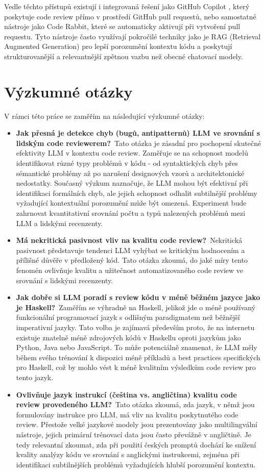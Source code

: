\documentclass[12pt, a4paper]{article}
\begin{document}
Vedle těchto přístupů existují i integrovaná řešení jako GitHub Copilot \cite{copilot2023}, který poskytuje code review přímo v prostředí GitHub pull requestů, nebo samostatné nástroje jako Code Rabbit, které se automaticky aktivují při vytvoření pull requestu. Tyto nástroje často využívají pokročilé techniky jako je RAG (Retrieval Augmented Generation) pro lepší porozumění kontextu kódu a poskytují strukturovanější a relevantnější zpětnou vazbu než obecné chatovací modely.


\section{Výzkumné otázky}
V rámci této práce se zaměřím na následující výzkumné otázky:
\begin{itemize}
\item \textbf{Jak přesná je detekce chyb (bugů, antipatternů) LLM ve srovnání s lidským code reviewerem?}\
Tato otázka je zásadní pro pochopení skutečné efektivity LLM v kontextu code review. Zaměřuje se na schopnost modelů identifikovat různé typy problémů v kódu - od syntaktických chyb přes sémantické problémy až po narušení designových vzorů a architektonické nedostatky. Současný výzkum naznačuje, že LLM mohou být efektivní při identifikaci formálních chyb, ale jejich schopnost odhalit subtilnější problémy vyžadující kontextuální porozumění může být omezená. Experiment bude zahrnovat kvantitativní srovnání počtu a typů nalezených problémů mezi LLM a lidskými recenzenty.
\item \textbf{Má nekritická pasivnost vliv na kvalitu code review?}\
Nekritická pasivnost představuje tendenci LLM vyhýbat se kritickým hodnocením a přílišné důvěře v předložený kód. Tato otázka zkoumá, do jaké míry tento fenomén ovlivňuje kvalitu a užitečnost automatizovaného code review ve srovnání s lidskými recenzenty.
\item \textbf{Jak dobře si LLM poradí s review kódu v méně běžném jazyce jako je Haskell?}\
Zaměřím se výhradně na Haskell, jelikož jde o méně používaný funkcionální programovací jazyk s odlišným paradigmatem než běžnější imperativní jazyky. Tato volba je zajímavá především proto, že na internetu existuje znatelně méně zdrojových kódů v Haskellu oproti jazykům jako Python, Java nebo JavaScript. To může potenciálně znamenat, že LLM měly během svého trénování k dispozici méně příkladů a best practices specifických pro Haskell, což by mohlo vést k méně kvalitním výsledkům code review pro tento jazyk.
\item \textbf{Ovlivňuje jazyk instrukcí (čeština vs. angličtina) kvalitu code review provedeného LLM?}\
Tato otázka zkoumá, zda jazyk, v němž jsou formulovány instrukce pro LLM, má vliv na kvalitu poskytnutého code review. Přestože velké jazykové modely jsou prezentovány jako multilingvální nástroje, jejich primární trénovací data jsou často převážně v angličtině. Je tedy relevantní zkoumat, zda při použití českých promptů dochází ke snížení kvality analýzy kódu ve srovnání s anglickými instrukcemi, zejména při identifikaci subtilnějších problémů vyžadujících hlubší porozumění kontextu.
\end{itemize}
\end{document}
